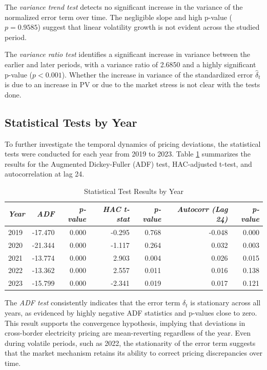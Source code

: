 \documentclass[12pt]{article}
\begin{document}
The \textit{variance trend test} detects no significant increase in the variance of the normalized error term over time. The negligible slope and high p-value ($p = 0.9585$) suggest that linear volatility growth is not evident across the studied period.

The \textit{variance ratio test} identifies a significant increase in variance between the earlier and later periods, with a variance ratio of 2.6850 and a highly significant p-value ($p < 0.001$). Whether the increase in variance of the standardized error $\hat{\delta}_t$ is due to an increase in PV or due to the market stress is not clear with the tests done. 

\subsection{Statistical Tests by Year}

To further investigate the temporal dynamics of pricing deviations, the statistical tests were conducted for each year from 2019 to 2023. Table \ref{tab:yearly_test_results} summarizes the results for the Augmented Dickey-Fuller (ADF) test, HAC-adjusted t-test, and autocorrelation at lag 24.
\begin{table}[ht]
   \footnotesize
   \centering
   \caption{Statistical Test Results by Year}
   \label{tab:yearly_test_results}
   \begin{tabular}{l|rr|rr|rr}
       \hline
       \textit{Year} & \textit{ADF} & \textit{p-value} & \textit{HAC t-stat} & \textit{p-value} & \textit{Autocorr (Lag 24)} & \textit{p-value} \\
       \hline
       2019 & -17.470 & 0.000 & -0.295 & 0.768 & -0.048 & 0.000 \\
       2020 & -21.344 & 0.000 & -1.117 & 0.264 &  0.032 & 0.003 \\
       2021 & -13.774 & 0.000 &  2.903 & 0.004 &  0.026 & 0.015 \\
       2022 & -13.362 & 0.000 &  2.557 & 0.011 &  0.016 & 0.138 \\
       2023 & -15.799 & 0.000 & -2.341 & 0.019 &  0.017 & 0.121 \\
       \hline
   \end{tabular}
\end{table}


The \textit{ADF test} consistently indicates that the error term $\delta_t$ is stationary across all years, as evidenced by highly negative ADF statistics and p-values close to zero. This result supports the convergence hypothesis, implying that deviations in cross-border electricity pricing are mean-reverting regardless of the year. Even during volatile periods, such as 2022, the stationarity of the error term suggests that the market mechanism retains its ability to correct pricing discrepancies over time.
\end{document}
